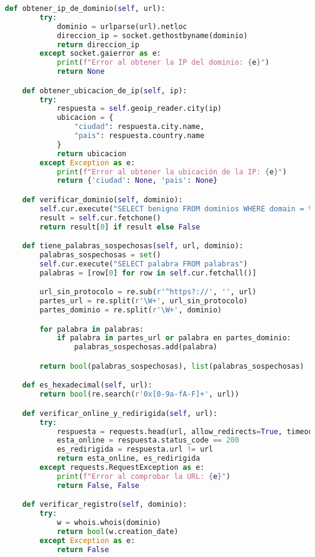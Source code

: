 \documentclass{article}
\begin{document}
\begin{lstlisting}[language=Python, caption=Clase para extraer características de URLs]
    def obtener_ip_de_dominio(self, url):
        try:
            dominio = urlparse(url).netloc
            direccion_ip = socket.gethostbyname(dominio)
            return direccion_ip
        except socket.gaierror as e:
            print(f"Error al obtener la IP del dominio: {e}")
            return None

    def obtener_ubicacion_de_ip(self, ip):
        try:
            respuesta = self.geoip_reader.city(ip)
            ubicacion = {
                "ciudad": respuesta.city.name,
                "pais": respuesta.country.name
            }
            return ubicacion
        except Exception as e:
            print(f"Error al obtener la ubicación de la IP: {e}")
            return {'ciudad': None, 'pais': None}

    def verificar_dominio(self, dominio):
        self.cur.execute("SELECT benigno FROM dominios WHERE domain = %s OR domain = %s", (dominio, dominio.replace('www.', '')))
        result = self.cur.fetchone()
        return result[0] if result else False

    def tiene_palabras_sospechosas(self, url, dominio):
        palabras_sospechosas = set()
        self.cur.execute("SELECT palabra FROM palabras")
        palabras = [row[0] for row in self.cur.fetchall()]

        url_sin_protocolo = re.sub(r'^https?://', '', url)
        partes_url = re.split(r'\W+', url_sin_protocolo)
        partes_dominio = re.split(r'\W+', dominio)

        for palabra in palabras:
            if palabra in partes_url or palabra en partes_dominio:
                palabras_sospechosas.add(palabra)

        return bool(palabras_sospechosas), list(palabras_sospechosas)

    def es_hexadecimal(self, url):
        return bool(re.search(r'0x[0-9a-fA-F]+', url))

    def verificar_online_y_redirigida(self, url):
        try:
            respuesta = requests.head(url, allow_redirects=True, timeout=2)
            esta_online = respuesta.status_code == 200
            es_redirigida = respuesta.url != url
            return esta_online, es_redirigida
        except requests.RequestException as e:
            print(f"Error al comprobar la URL: {e}")
            return False, False

    def verificar_registro(self, dominio):
        try:
            w = whois.whois(dominio)
            return bool(w.creation_date)
        except Exception as e:
            return False


\end{lstlisting}
\end{document}
